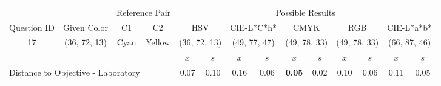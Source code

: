 \begin{table}[H]
  \resizebox{\textwidth}{!} {
  \begin{tabular}{lccccccccccccc}
    \hline
    \multicolumn{1}{c}{}                              &                                      & \multicolumn{2}{c}{Reference Pair}                   & \multicolumn{10}{c}{Possible Results}                                                                                                                                                                                                                                                                                        \\ \cline{3-14}
    \multicolumn{1}{c}{\multirow{-2}{*}{Question ID}} & \multirow{-2}{*}{Given Color}        & C1                       & C2                         & \multicolumn{2}{c}{HSV}                                        & \multicolumn{2}{c}{CIE-L*C*h*}                                 & \multicolumn{2}{c}{CMYK}                                       & \multicolumn{2}{c}{RGB}                                        & \multicolumn{2}{c}{CIE-L*a*b*}                                 \\ \hline
    \multicolumn{1}{c}{17}                             & \cellcolor[HTML]{00FF00}(36, 72, 13) & \multicolumn{1}{c|}{Cyan} & \multicolumn{1}{c|}{Yellow}  & \multicolumn{2}{c|}{\cellcolor[HTML]{00FF00}(36, 72, 13)}      & \multicolumn{2}{c|}{\cellcolor[HTML]{6EFFA3}(49, 77, 47)}       & \multicolumn{2}{c|}{\cellcolor[HTML]{80FF80}(49, 78, 33)}       & \multicolumn{2}{c|}{\cellcolor[HTML]{80FF80}(49, 78, 33)}       & \multicolumn{2}{c|}{\cellcolor[HTML]{C4FF9E}(66, 87, 46)}       \\ \hline
                                                      & \multicolumn{1}{l}{}                 & \multicolumn{1}{l}{}     & \multicolumn{1}{l}{}       & \multicolumn{1}{c}{$\overline{x}$} & \multicolumn{1}{c}{$s$} & \multicolumn{1}{c}{$\overline{x}$} & \multicolumn{1}{c}{$s$} & \multicolumn{1}{c}{$\overline{x}$} & \multicolumn{1}{c}{$s$} & \multicolumn{1}{c}{$\overline{x}$} & \multicolumn{1}{c}{$s$} & \multicolumn{1}{c}{$\overline{x}$} & \multicolumn{1}{c}{$s$} \\ \hline
    \multicolumn{4}{l}{Distance to Objective - Laboratory}                                                                                           & \multicolumn{1}{|c}{0.07}       & \multicolumn{1}{c|}{0.10}    & \multicolumn{1}{|c}{0.16}       & \multicolumn{1}{c|}{0.06}    & \multicolumn{1}{|c}{\textbf{0.05}}       & \multicolumn{1}{c|}{0.02}    & \multicolumn{1}{|c}{0.10}       & \multicolumn{1}{c|}{0.06}    & \multicolumn{1}{|c}{0.11}       & \multicolumn{1}{c|}{0.05}    \\

\end{tabular}}
\end{table}
